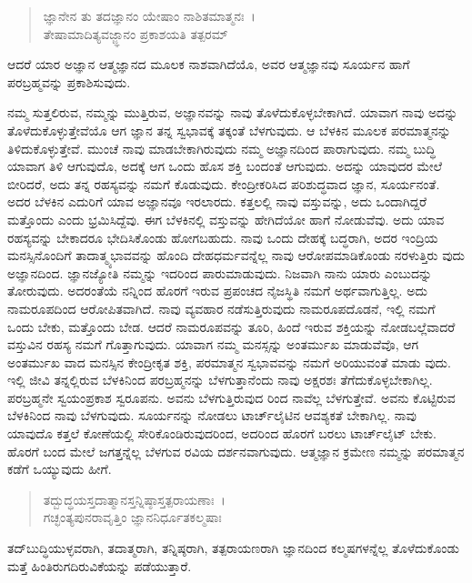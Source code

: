 \begin{verse}
ಜ್ಞಾನೇನ ತು ತದಜ್ಞಾನಂ ಯೇಷಾಂ ನಾಶಿತಮಾತ್ಮನಃ~।\\ತೇಷಾಮಾದಿತ್ಯವಜ್ಜ್ಞಾನಂ ಪ್ರಕಾಶಯತಿ ತತ್ಪರಮ್ 
\end{verse}

{\small ಆದರೆ ಯಾರ ಅಜ್ಞಾನ ಆತ್ಮಜ್ಞಾನದ ಮೂಲಕ ನಾಶವಾಗಿದೆಯೊ, ಅವರ ಆತ್ಮಜ್ಞಾನವು ಸೂರ್ಯನ ಹಾಗೆ ಪರಬ್ರಹ್ಮವನ್ನು ಪ್ರಕಾಶಿಸುವುದು.}

ನಮ್ಮ ಸುತ್ತಲಿರುವ, ನಮ್ಮನ್ನು ಮುತ್ತಿರುವ, ಅಜ್ಞಾನವನ್ನು ನಾವು ತೊಳೆದುಕೊಳ್ಳಬೇಕಾಗಿದೆ. ಯಾವಾಗ ನಾವು ಅದನ್ನು ತೊಳೆದುಕೊಳ್ಳುತ್ತೇವೆಯೊ ಆಗ ಜ್ಞಾನ ತನ್ನ ಸ್ವಭಾವಕ್ಕೆ ತಕ್ಕಂತೆ ಬೆಳಗುವುದು. ಆ ಬೆಳಕಿನ ಮೂಲಕ ಪರಮಾತ್ಮನನ್ನು ತಿಳಿದುಕೊಳ್ಳುತ್ತೇವೆ. ಮುಂಚೆ ನಾವು ಮಾಡಬೇಕಾಗಿರುವುದು ನಮ್ಮ ಅಜ್ಞಾನದಿಂದ ಪಾರಾಗುವುದು. ನಮ್ಮ ಬುದ್ಧಿ ಯಾವಾಗ ತಿಳಿ ಆಗುವುದೊ, ಅದಕ್ಕೆ ಆಗ ಒಂದು ಹೊಸ ಶಕ್ತಿ ಬಂದಂತೆ ಆಗುವುದು. ಅದನ್ನು ಯಾವುದರ ಮೇಲೆ ಬೀರಿದರೆ, ಅದು ತನ್ನ ರಹಸ್ಯವನ್ನು ನಮಗೆ ಕೊಡುವುದು. ಕೇಂದ್ರೀಕರಿಸಿದ ಪರಿಶುದ್ಧವಾದ ಜ್ಞಾನ, ಸೂರ್ಯನಂತೆ. ಅದರ ಬೆಳಕಿನ ಎದುರಿಗೆ ಯಾವ ಅಜ್ಞಾನವೂ ಇರಲಾರದು. ಕತ್ತಲಲ್ಲಿ ನಾವು ವಸ್ತುವನ್ನು, ಅದು ಒಂದಾಗಿದ್ದರೆ ಮತ್ತೊಂದು ಎಂದು ಭ್ರಮಿಸಿದ್ದೆವು. ಈಗ ಬೆಳಕಿನಲ್ಲಿ ವಸ್ತುವನ್ನು ಹೇಗಿದೆಯೋ ಹಾಗೆ ನೋಡುವೆವು. ಅದು ಯಾವ ರಹಸ್ಯವನ್ನು ಬೇಕಾದರೂ ಭೇದಿಸಿಕೊಂಡು ಹೋಗಬಹುದು. ನಾವು ಒಂದು ದೇಹಕ್ಕೆ ಬದ್ಧರಾಗಿ, ಅದರ ಇಂದ್ರಿಯ ಮನಸ್ಸಿನೊಂದಿಗೆ ತಾದಾತ್ಮ್ಯಭಾವವನ್ನು ಹೊಂದಿ ದೇಹಧರ್ಮವನ್ನೆಲ್ಲ ನಾವು ಆರೋಪಮಾಡಿಕೊಂಡು ನರಳುತ್ತಿರು ವುದು ಅಜ್ಞಾನದಿಂದ. ಜ್ಞಾನಜ್ಯೋತಿ ನಮ್ಮನ್ನು ಇದರಿಂದ ಪಾರುಮಾಡುವುದು. ನಿಜವಾಗಿ ನಾನು ಯಾರು ಎಂಬುದನ್ನು ತೋರುವುದು. ಅದರಂತೆಯೆ ನನ್ನಿಂದ ಹೊರಗೆ ಇರುವ ಪ್ರಪಂಚದ ನೈಜಸ್ಥಿತಿ ನಮಗೆ ಅರ್ಥವಾಗುತ್ತಿಲ್ಲ. ಅದು ನಾಮರೂಪದಿಂದ ಆರೋಪಿತವಾಗಿದೆ. ನಾವು ವ್ಯವಹಾರ ನಡೆಸುತ್ತಿರುವುದು ನಾಮರೂಪದೊಡನೆ, ಇಲ್ಲಿ ನಮಗೆ ಒಂದು ಬೇಕು, ಮತ್ತೊಂದು ಬೇಡ. ಆದರೆ ನಾಮರೂಪವನ್ನು ತೂರಿ, ಹಿಂದೆ ಇರುವ ಶಕ್ತಿಯನ್ನು ನೋಡಬಲ್ಲೆವಾದರೆ ವಸ್ತುವಿನ ರಹಸ್ಯ ನಮಗೆ ಗೊತ್ತಾಗುವುದು. ಯಾವಾಗ ನಮ್ಮ ಮನಸ್ಸನ್ನು ಅಂತರ್ಮುಖ ಮಾಡುವೆವೊ, ಆಗ ಅಂತರ್ಮುಖ ವಾದ ಮನಸ್ಸಿನ ಕೇಂದ್ರೀಕೃತ ಶಕ್ತಿ, ಪರಮಾತ್ಮನ ಸ್ವಭಾವವನ್ನು ನಮಗೆ ಅರಿಯುವಂತೆ ಮಾಡು ವುದು. ಇಲ್ಲಿ ಜೀವಿ ತನ್ನಲ್ಲಿರುವ ಬೆಳಕಿನಿಂದ ಪರಬ್ರಹ್ಮನನ್ನು ಬೆಳಗುತ್ತಾನೆಂದು ನಾವು ಅಕ್ಷರಶಃ ತೆಗೆದುಕೊಳ್ಳಬೇಕಾಗಿಲ್ಲ. ಪರಬ್ರಹ್ಮನೇ ಸ್ವಯಂಪ್ರಕಾಶ ಸ್ವರೂಪನು. ಅವನು ಬೆಳಗುತ್ತಿರುವುದ ರಿಂದ ನಾವೆಲ್ಲ ಬೆಳಗುತ್ತೇವೆ. ಅವನು ಕೊಟ್ಟಿರುವ ಬೆಳಕಿನಿಂದ ನಾವು ಬೆಳಗುವುದು. ಸೂರ್ಯನನ್ನು ನೋಡಲು ಟಾರ್ಚ್​ಲೈಟಿನ ಆವಶ್ಯಕತೆ ಬೇಕಾಗಿಲ್ಲ. ನಾವು ಯಾವುದೊ ಕತ್ತಲೆ ಕೋಣೆಯಲ್ಲಿ ಸೇರಿಕೊಂಡಿರುವುದರಿಂದ, ಅದರಿಂದ ಹೊರಗೆ ಬರಲು ಟಾರ್ಚ್​ಲೈಟ್ ಬೇಕು. ಹೊರಗೆ ಬಂದ ಮೇಲೆ ಜಗತ್ತನ್ನೆಲ್ಲ ಬೆಳಗುವ ರವಿಯ ದರ್ಶನವಾಗುವುದು. ಆತ್ಮಜ್ಞಾನ ಕ್ರಮೇಣ ನಮ್ಮನ್ನು ಪರಮಾತ್ಮನ ಕಡೆಗೆ ಒಯ್ಯುವುದು ಹೀಗೆ.

\begin{verse}
ತದ್ಬುದ್ಧಯಸ್ತದಾತ್ಮಾನಸ್ತನ್ನಿಷ್ಠಾಸ್ತತ್ಪರಾಯಣಾಃ~।\\ಗಚ್ಛಂತ್ಯಪುನರಾವೃತ್ತಿಂ ಜ್ಞಾನನಿರ್ಧೂತಕಲ್ಮಷಾಃ 
\end{verse}

{\small ತದ್​ಬುದ್ಧಿಯುಳ್ಳವರಾಗಿ, ತದಾತ್ಮರಾಗಿ, ತನ್ನಿಷ್ಠರಾಗಿ, ತತ್ಪರಾಯಣರಾಗಿ ಜ್ಞಾನದಿಂದ ಕಲ್ಮಷಗಳನ್ನೆಲ್ಲ ತೊಳೆದುಕೊಂಡು ಮತ್ತೆ ಹಿಂತಿರುಗದಿರುವಿಕೆಯನ್ನು ಪಡೆಯುತ್ತಾರೆ.}

